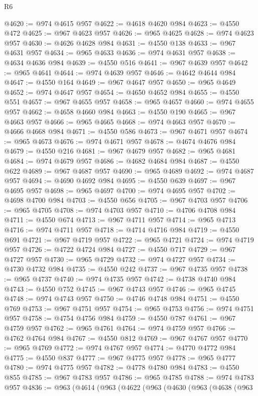 \begin{lexlean}{R6}
\begin{coremodule}
@4620 := @974 @4615 @957
@4622 := @4618 @4620 @984
@4623 := @4550 @472
@4625 := @967 @4623 @957
@4626 := @965 @4625
@4628 := @974 @4623 @957
@4630 := @4626 @4628 @984
@4631 := @4550 @138
@4633 := @967 @4631 @957
@4634 := @965 @4633
@4636 := @974 @4631 @957
@4638 := @4634 @4636 @984
@4639 := @4550 @516
@4641 := @967 @4639 @957
@4642 := @965 @4641
@4644 := @974 @4639 @957
@4646 := @4642 @4644 @984
@4647 := @4550 @164
@4649 := @967 @4647 @957
@4650 := @965 @4649
@4652 := @974 @4647 @957
@4654 := @4650 @4652 @984
@4655 := @4550 @551
@4657 := @967 @4655 @957
@4658 := @965 @4657
@4660 := @974 @4655 @957
@4662 := @4658 @4660 @984
@4663 := @4550 @190
@4665 := @967 @4663 @957
@4666 := @965 @4665
@4668 := @974 @4663 @957
@4670 := @4666 @4668 @984
@4671 := @4550 @586
@4673 := @967 @4671 @957
@4674 := @965 @4673
@4676 := @974 @4671 @957
@4678 := @4674 @4676 @984
@4679 := @4550 @216
@4681 := @967 @4679 @957
@4682 := @965 @4681
@4684 := @974 @4679 @957
@4686 := @4682 @4684 @984
@4687 := @4550 @622
@4689 := @967 @4687 @957
@4690 := @965 @4689
@4692 := @974 @4687 @957
@4694 := @4690 @4692 @984
@4695 := @4550 @639
@4697 := @967 @4695 @957
@4698 := @965 @4697
@4700 := @974 @4695 @957
@4702 := @4698 @4700 @984
@4703 := @4550 @656
@4705 := @967 @4703 @957
@4706 := @965 @4705
@4708 := @974 @4703 @957
@4710 := @4706 @4708 @984
@4711 := @4550 @674
@4713 := @967 @4711 @957
@4714 := @965 @4713
@4716 := @974 @4711 @957
@4718 := @4714 @4716 @984
@4719 := @4550 @691
@4721 := @967 @4719 @957
@4722 := @965 @4721
@4724 := @974 @4719 @957
@4726 := @4722 @4724 @984
@4727 := @4550 @717
@4729 := @967 @4727 @957
@4730 := @965 @4729
@4732 := @974 @4727 @957
@4734 := @4730 @4732 @984
@4735 := @4550 @242
@4737 := @967 @4735 @957
@4738 := @965 @4737
@4740 := @974 @4735 @957
@4742 := @4738 @4740 @984
@4743 := @4550 @752
@4745 := @967 @4743 @957
@4746 := @965 @4745
@4748 := @974 @4743 @957
@4750 := @4746 @4748 @984
@4751 := @4550 @769
@4753 := @967 @4751 @957
@4754 := @965 @4753
@4756 := @974 @4751 @957
@4758 := @4754 @4756 @984
@4759 := @4550 @787
@4761 := @967 @4759 @957
@4762 := @965 @4761
@4764 := @974 @4759 @957
@4766 := @4762 @4764 @984
@4767 := @4550 @812
@4769 := @967 @4767 @957
@4770 := @965 @4769
@4772 := @974 @4767 @957
@4774 := @4770 @4772 @984
@4775 := @4550 @837
@4777 := @967 @4775 @957
@4778 := @965 @4777
@4780 := @974 @4775 @957
@4782 := @4778 @4780 @984
@4783 := @4550 @855
@4785 := @967 @4783 @957
@4786 := @965 @4785
@4788 := @974 @4783 @957
@4836 := @963
    (@4614
      (@963
        (@4622
          (@963
            (@4630
              (@963
                (@4638
                  (@963

\end{coremodule}
\end{lexlean}
